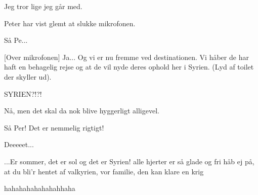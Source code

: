 \documentclass[a4paper,11pt]{article}
\begin{document}
\begin{sketch}

 Jeg tror lige jeg går  med.


 Peter har vist glemt at slukke mikrofonen.


 Så Pe... 

[Over mikrofonen] Ja... Og vi er nu fremme ved destinationen. Vi håber de har haft en behagelig rejse og at de vil nyde deres ophold her i Syrien. (Lyd af toilet der skyller ud).

 SYRIEN?!?!

 Nå, men det skal da nok blive hyggerligt alligevel.

 Så Per! Det er nemmelig rigtigt!


 Deeeeet...

\end{sketch}
\begin{song}

...Er sommer, det er sol og det er Syrien!
alle hjerter er så glade og fri
håb ej på, at du bli’r hentet af valkyrien,
vor familie, den kan klare en krig

\end{song}
\begin{sketch}

 hahahahahahahahhaha


\end{sketch}
\end{document}

